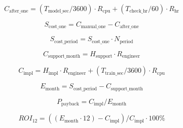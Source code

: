 \begin{equation}
\label{eq:c_after_one-22}
C_{\text{after\_one}} = (T_{\text{model\_sec}} / 3600) \cdot R_{\text{cpu}} + (T_{\text{check\_hr}} / 60) \cdot R_{\text{hr}}
\end{equation}

\begin{equation}
\label{eq:s_cost_one-23}
S_{\text{cost\_one}} = C_{\text{manual\_one}} - C_{\text{after\_one}}
\end{equation}

\begin{equation}
\label{eq:s_cost_period-24}
S_{\text{cost\_period}} = S_{\text{cost\_one}} \cdot N_{\text{period}}
\end{equation}

\begin{equation}
\label{eq:c_support_month-25}
C_{\text{support\_month}} = H_{\text{support}} \cdot R_{\text{engineer}}
\end{equation}

\begin{equation}
\label{eq:c_impl-26}
C_{\text{impl}} = H_{\text{impl}} \cdot R_{\text{engineer}} + (T_{\text{train\_sec}} / 3600) \cdot R_{\text{cpu}}
\end{equation}

\begin{equation}
\label{eq:e_month-27}
E_{\text{month}} = S_{\text{cost\_period}} - C_{\text{support\_month}}
\end{equation}

\begin{equation}
\label{eq:p_payback-28}
P_{\text{payback}} = C_{\text{impl}} / E_{\text{month}}
\end{equation}

\begin{equation}
\label{eq:roi_12-29}
ROI_{12} = ((E_{\text{month}} \cdot 12) - C_{\text{impl}}) / C_{\text{impl}} \cdot 100 \%
\end{equation}

